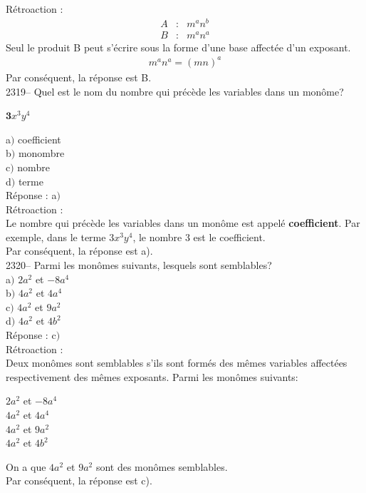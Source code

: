 \documentclass[letterpaper, 12pt]{article}
\begin{document}
R\'etroaction :
\begin{eqnarray*}
 A &:& m^{a}n^{b}\\
 B &:& m^{a}n^{a}
\end{eqnarray*}
Seul le produit B peut s'\'ecrire sous la forme d'une base affect\'ee d'un exposant.
\begin{eqnarray*}
 m^{a}n^{a}=(mn)^{a}
\end{eqnarray*}
Par cons\'equent, la r\'eponse est B.\\

2319-- Quel est le nom du nombre qui pr\'ec\`ede les variables dans un mon\^ome?\\
\begin{center}
 $\textbf{3}x^{3}y^{4}$
\end{center}


a$)$ coefficient\\
b$)$ monombre\\
c$)$ nombre\\
d$)$ terme\\

R\'eponse : a$)$\\

R\'etroaction :\\
Le nombre qui pr\'ec\`ede les variables dans un mon\^ome est appel\'e \textbf{coefficient}. Par exemple, dans le terme $3x^{3}y^{4}$, le nombre 3 est le coefficient.\\
Par cons\'equent, la r\'eponse est a).\\

2320-- Parmi les mon\^omes suivants, lesquels sont semblables?\\

a$)$ $2a^{2}$ et $-8a^{4}$\\
b$)$ $4a^{2}$ et $4a^{4}$\\
c$)$ $4a^{2}$ et $9a^{2}$\\
d$)$ $4a^{2}$ et $4b^{2}$\\

R\'eponse : c$)$\\

R\'etroaction :\\
Deux mon\^omes sont semblables s'ils sont form\'es des m\^emes variables affect\'ees respectivement des m\^emes exposants. Parmi les mon\^omes suivants:
\begin{center}
  $2a^{2}$ et $-8a^{4}$\\
 $4a^{2}$ et $4a^{4}$\\
 $4a^{2}$ et $9a^{2}$\\
 $4a^{2}$ et $4b^{2}$\\
\end{center}
On a que $4a^{2}$ et $9a^{2}$ sont des mon\^omes semblables.\\
Par cons\'equent, la r\'eponse est c).\\
\end{document}
